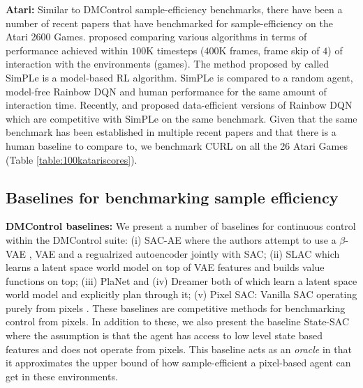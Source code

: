 \documentclass{article}
\begin{document}
{\textbf{Atari:}} Similar to DMControl sample-efficiency benchmarks, there have been a number of recent papers that have benchmarked for sample-efficiency on the Atari 2600 Games. \citet{kaiser2019model} proposed comparing various algorithms in terms of performance achieved within $100$K timesteps ($400$K frames, frame skip of $4$) of interaction with the environments (games). The method proposed by \citet{kaiser2019model} called SimPLe is a model-based RL algorithm. SimPLe is compared to a random agent, model-free Rainbow DQN \cite{hessel2017rainbow} and human performance for the same amount of interaction time. Recently, \citet{van2019use} and \citet{kielak2020rainbow} proposed data-efficient versions of Rainbow DQN which are competitive with SimPLe on the same benchmark. Given that the same benchmark has been established in multiple recent papers and that there is a human baseline to compare to, we benchmark CURL on all the 26 Atari Games (Table \ref{table:100katariscores}).

\subsection{Baselines for benchmarking sample efficiency}
\textbf{DMControl baselines:} We present a number of baselines for continuous control within the DMControl suite: (i) SAC-AE \cite{yarats2019improving} where the authors attempt to use a $\beta$-VAE \cite{higgins2017darla}, VAE \cite{kingma2013auto} and a regualrized autoencoder \citet{vincent2008extracting,ghosh2019} jointly with SAC; (ii) SLAC \cite{lee2019stochastic} which learns a latent space world model on top of VAE features \citet{ha2018world} and builds value functions on top; (iii) PlaNet and (iv) Dreamer \cite{hafner2018learning, hafner2019dream} both of which learn a latent space world model and explicitly plan through it; (v) Pixel SAC: Vanilla SAC operating purely from pixels \cite{haarnoja2018soft}. These baselines are competitive methods for benchmarking control from pixels. In addition to these, we also present the baseline State-SAC where the assumption is that the agent has access to low level state based features and does not operate from pixels. This baseline acts as an {\it oracle} in that it approximates the upper bound of how sample-efficient a pixel-based agent can get in these environments. 
\end{document}
